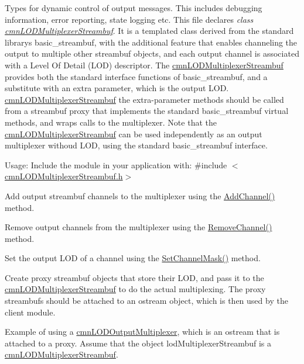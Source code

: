 Types for dynamic control of output messages. This includes debugging information, error reporting, state logging etc. This file declares {\itshape class \hyperlink{classcmn_l_o_d_multiplexer_streambuf}{cmn\+L\+O\+D\+Multiplexer\+Streambuf}}. It is a templated class derived from the standard library\textquotesingle{}s basic\+\_\+streambuf, with the additional feature that enables channeling the output to multiple other streambuf objects, and each output channel is associated with a Level Of Detail (L\+O\+D) descriptor. The \hyperlink{classcmn_l_o_d_multiplexer_streambuf}{cmn\+L\+O\+D\+Multiplexer\+Streambuf} provides both the standard interface functions of basic\+\_\+streambuf, and a substitute with an extra parameter, which is the output L\+O\+D. \hyperlink{classcmn_l_o_d_multiplexer_streambuf}{cmn\+L\+O\+D\+Multiplexer\+Streambuf} the extra-\/parameter methods should be called from a streambuf proxy that implements the standard basic\+\_\+streambuf virtual methods, and wraps calls to the multiplexer. Note that the \hyperlink{classcmn_l_o_d_multiplexer_streambuf}{cmn\+L\+O\+D\+Multiplexer\+Streambuf} can be used independently as an output multiplexer withoud L\+O\+D, using the standard basic\+\_\+streambuf interface.

Usage\+: Include the module in your application with\+: \#include $<$\hyperlink{cmn_l_o_d_multiplexer_streambuf_8h}{cmn\+L\+O\+D\+Multiplexer\+Streambuf.\+h}$>$

Add output streambuf channels to the multiplexer using the \hyperlink{classcmn_l_o_d_multiplexer_streambuf_a13062543394fee2e08419f0ecad3b5c1}{Add\+Channel()} method.

Remove output channels from the multiplexer using the \hyperlink{classcmn_l_o_d_multiplexer_streambuf_ab1c5504083f7074b012335f38593f7c2}{Remove\+Channel()} method.

Set the output L\+O\+D of a channel using the \hyperlink{classcmn_l_o_d_multiplexer_streambuf_a963eadbf72872649aa91d2ab59d2c433}{Set\+Channel\+Mask()} method.

Create proxy streambuf objects that store their L\+O\+D, and pass it to the \hyperlink{classcmn_l_o_d_multiplexer_streambuf}{cmn\+L\+O\+D\+Multiplexer\+Streambuf} to do the actual multiplexing. The proxy streambufs should be attached to an ostream object, which is then used by the client module.

Example of using a \hyperlink{classcmn_l_o_d_output_multiplexer}{cmn\+L\+O\+D\+Output\+Multiplexer}, which is an ostream that is attached to a proxy. Assume that the object lod\+Multiplexer\+Streambuf is a \hyperlink{classcmn_l_o_d_multiplexer_streambuf}{cmn\+L\+O\+D\+Multiplexer\+Streambuf}.


